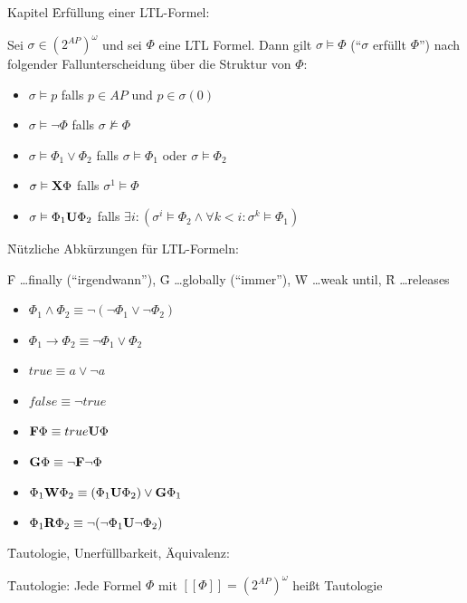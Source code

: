 \begin{chapter}{Kapitel}
\f{Erfüllung einer LTL-Formel}:
\vspace*{5pt}

\noindent Sei $\sigma \in (2^{AP})^\omega$ und sei $\Phi$ eine LTL Formel. Dann gilt $\sigma \vDash \Phi$ (``$\sigma$ erfüllt $\Phi$'') nach folgender
Fallunterscheidung über die Struktur von $\Phi$:
\begin{itemize}
 \item $\sigma \vDash p$ \qquad \qquad   falls $p\in AP$ und $p\in\sigma(0)$
 \item $\sigma \vDash \neg\Phi$ \qquad  \qquad falls $\sigma \nvDash \Phi$
 \item $\sigma \vDash \Phi_1 \vee \Phi_2$ \qquad falls $\sigma \vDash \Phi_1$ oder $\sigma \vDash \Phi_2$
 \item $\sigma \vDash \f{X}\Phi$ \qquad  \qquad falls $\sigma^1 \vDash \Phi $
 \item $\sigma \vDash \Phi_1\f{U}\Phi_2$ \qquad falls $\exists i: \left(\sigma^i\vDash \Phi_2 \wedge \forall k < i:\sigma^k \vDash \Phi_1 \right)$
\end{itemize}
\vspace*{5pt}

\f{Nützliche Abkürzungen für LTL-Formeln}:
\vspace*{4pt}

\f{F} \dots finally (``irgendwann''), \f{G} \dots globally (``immer''), \f{W} \dots weak until, \f{R} \dots releases
\begin{itemize}
 \item $\Phi_1\wedge\Phi_2 \equiv \neg(\neg\Phi_1\vee\neg\Phi_2)$
 \item $\Phi_1 \rightarrow \Phi_2 \equiv \neg\Phi_1\vee\Phi_2$
 \item $true \equiv a\vee\neg a$
 \item $false \equiv \neg true$
 \item $\f{F}\Phi \equiv true\f{U}\Phi$
 \item $\f{G}\Phi \equiv \neg\f{F}\neg\Phi$
 \item $\Phi_1\f{W}\Phi_2 \equiv (\Phi_1\f{U}\Phi_2)\vee\f{G}\Phi_1$
 \item $\Phi_1\f{R}\Phi_2 \equiv \neg(\neg\Phi_1\f{U}\neg\Phi_2)$
\end{itemize}
\vspace*{5pt}

\f{Tautologie, Unerfüllbarkeit, Äquivalenz}:
\vspace*{4pt}

\f{Tautologie}: Jede Formel $\Phi$ mit $[[\Phi]] = \left(2^{AP}\right)^\omega$ heißt Tautologie
\vspace*{4pt}


\end{chapter}
